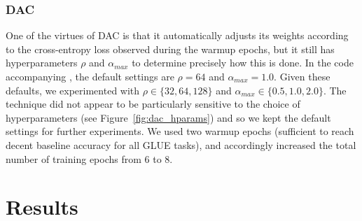 \documentclass[11pt]{article}
\begin{document}
\subsubsection*{\textsc{DAC}}

One of the virtues of \textsc{DAC} is that it automatically adjusts its weights according to the cross-entropy loss observed during the warmup epochs, but it still has hyperparameters $\rho$ and $\alpha_{max}$ to determine precisely how this is done. In the code accompanying \cite{thulasidasan2019combating}, the default settings are $\rho=64$ and $\alpha_{max}=1.0$. Given these defaults, we experimented with $\rho \in \{32,64,128\}$ and $\alpha_{max}\in \{0.5, 1.0, 2.0\}$. The technique did not appear to be particularly sensitive to the choice of hyperparameters (see Figure~\ref{fig:dac_hparams}) and so we kept the default settings for further experiments. We used two warmup epochs (sufficient to reach decent baseline accuracy for all GLUE tasks), and accordingly increased the total number of training epochs from 6 to 8.


\section{Results}
\label{sec:results}
\end{document}
